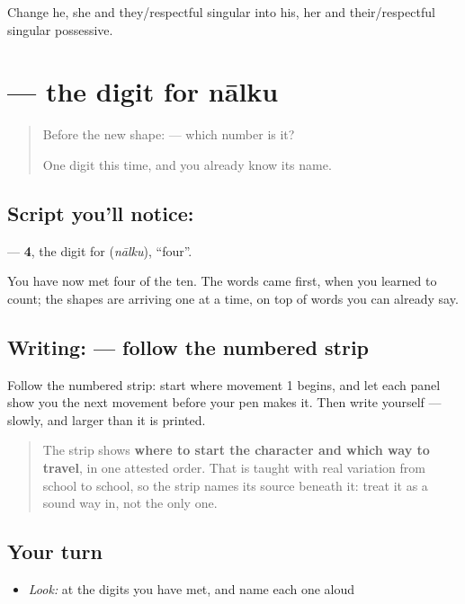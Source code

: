 \begin{tcolorbox}[breakable,colback=teal!4,colframe=teal!35!black,title={Before you move on}]
Change he, she and they/respectful singular into his, her and their/respectful singular possessive.
\end{tcolorbox}
\section[\texorpdfstring{\kn{೪} (4)}{೪ (4)}]{ — the digit for nālku}

\label{lesson:KA-S143-digit-four}



\begin{quote}
Before the new shape: \textbf{} — which number is it?

One digit this time, and you already know its name.
\end{quote}

\subsection*{Script you'll notice: }
\textbf{} — \textbf{4}, the digit for \textbf{} (\emph{nālku}), \textquotedblleft{}four\textquotedblright{}.

You have now met four of the ten. The words came first, when you learned to count; the shapes are arriving one at a time, on top of words you can already say.

\subsection*{Writing:  — follow the numbered strip}

Follow the numbered strip: start where movement 1 begins, and let each panel show you the next movement before your pen makes it. Then write  yourself — slowly, and larger than it is printed.

\begin{quote}
The strip shows \textbf{where to start the character and which way to travel}, in one attested order. That is taught with real variation from school to school, so the strip names its source beneath it: treat it as a sound way in, not the only one.
\end{quote}

\subsection*{Your turn}
\begin{itemize}
\raggedright
  \item \emph{Look:} at the digits you have met, and name each one aloud
\end{itemize}

